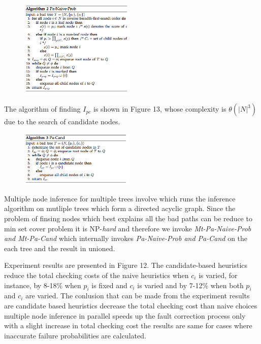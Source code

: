 \documentclass[10pt]{sigplan-proc-varsize}
\begin{document}
\begin{figure}[h!]
  \centering
    \includegraphics[width=0.49\textwidth]{Fig12}
\end{figure}

The algorithm of finding  $I_{pc}$ is shown in Figure 13, whose complexity is $\theta(|N|^3 )$ due to the search of candidate nodes.
\begin{figure}[h!]
  \centering
    \includegraphics[width=0.49\textwidth]{Fig13}
\end{figure}

Multiple node inference for multiple trees involve which runs the inference algorithm on mutliple trees which form a directed acyclic graph. 
Since the problem of finsing nodes which best explains all the bad paths can be reduce to min set cover problem it is NP-{\it hard} and 
therefore we invoke {\it Mt-Pa-Naive-Prob and Mt-Pa-Cand} which internally invokes {\it Pa-Naive-Prob and Pa-Cand} on the each tree and the result in unioned. 

Experiment results are presented in Figure 12. 
The candidate-based heuristics reduce the total checking costs of the naive heuristics when $c_i$ is varied, 
for instance, by 8-18\% when $p_i$ is fixed and $c_i$ is varied and by 7-12\% when both  $p_i$ and $c_i$ are varied. 
The conlusion that can be made from the experiment results are candidate based heuristics decrease the total checking cost than naive choices 
multiple node inference in parallel speeds up the fault correction process only with a slight increase in total checking cost the results are 
same for cases where inaccurate failure probabilities are calculated. 
\end{document}
